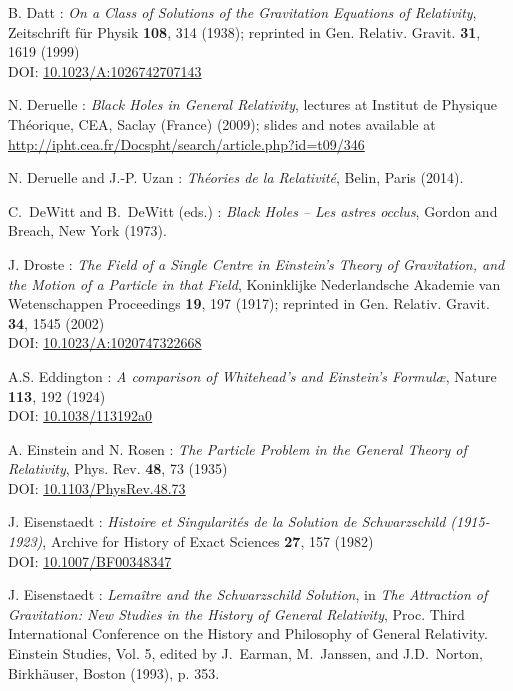 \begin{thebibliography}{123}
B. Datt :
{\em On a Class of Solutions of the Gravitation Equations of Relativity},
Zeitschrift für Physik {\bf 108}, 314 (1938);
reprinted in Gen. Relativ. Gravit. {\bf 31}, 1619 (1999)\\
DOI: \href{http://dx.doi.org/10.1023/10.1023/A:1026742707143}{10.1023/A:1026742707143}

N. Deruelle : {\em Black Holes in General Relativity}, lectures at
Institut de Physique Théorique, CEA, Saclay (France) (2009); slides and notes
available at \\
\url{http://ipht.cea.fr/Docspht/search/article.php?id=t09/346}

N. Deruelle and J.-P. Uzan : {\em Th\'eories de la Relativit\'e},
Belin, Paris (2014).

C.~DeWitt and B.~DeWitt (eds.) :
{\em Black Holes -- Les astres occlus},
Gordon and Breach, New York (1973).

J. Droste :
{\em The Field of a Single Centre in Einstein's Theory of Gravitation, and the Motion of a Particle in that Field},
Koninklijke Nederlandsche Akademie van Wetenschappen Proceedings {\bf 19}, 197 (1917);
reprinted in Gen. Relativ. Gravit. {\bf 34}, 1545 (2002)\\
DOI: \href{http://dx.doi.org/10.1023/A:1020747322668}{10.1023/A:1020747322668}

A.S. Eddington : {\em A comparison of Whitehead's and Einstein's Formul\ae},
Nature {\bf 113}, 192 (1924) \\
DOI: \href{http://dx.doi.org/10.1038/113192a0}{10.1038/113192a0}

A. Einstein and N. Rosen :
{\em The Particle Problem in the General Theory of Relativity},
Phys. Rev. {\bf 48}, 73 (1935) \\
DOI: \href{https://doi.org/10.1103/PhysRev.48.73}{10.1103/PhysRev.48.73}

J. Eisenstaedt :
{\em Histoire et Singularit\'es de la Solution de Schwarzschild (1915-1923)},
Archive for History of Exact Sciences {\bf 27}, 157 (1982) \\
DOI: \href{http://dx.doi.org/10.1007/BF00348347}{10.1007/BF00348347}

J. Eisenstaedt : {\em Lemaître and the Schwarzschild Solution}, in
{\em The Attraction of Gravitation: New Studies in the History of
General Relativity}, Proc. Third International Conference on the History and Philosophy of General Relativity. Einstein
Studies, Vol. 5, edited by J.~Earman, M.~Janssen, and J.D.~Norton,
Birkhäuser, Boston (1993), p. 353.


\end{thebibliography}
